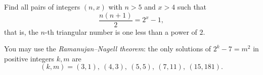 Find all pairs of integers $(n,x)$ with $n>5$ and $x>4$ such that
\[\dfrac{n(n+1)}{2}=2^x-1,\]
that is, the $n$-th triangular number is one less than a power of $2$.

You may use the \emph{Ramanujan--Nagell theorem}: the only solutions of $2^k-7=m^2$ in positive integers $k,m$ are
\[(k,m)=(3,1),\ (4,3),\ (5,5),\ (7,11),\ (15,181).\]
